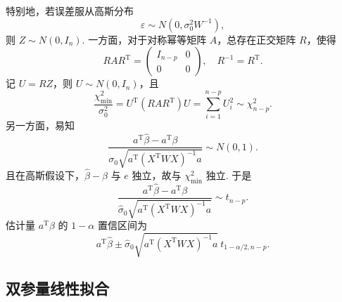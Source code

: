 特别地，若误差服从高斯分布
\begin{equation*}
	\varepsilon\sim N(0,\sigma_0^2W^{-1}),
\end{equation*}
则 \(Z\sim N(0,I_n)\). 一方面，对于对称幂等矩阵 \(A\)，总存在正交矩阵 \(R\)，使得
\begin{equation*}
	RAR^\mathrm{T}=\begin{pmatrix}I_{n-p}&0\\0&0\end{pmatrix},
	\quad R^{-1}=R^\mathrm{T}.
\end{equation*}
记 \(U=RZ\)，则 \(U\sim N(0,I_n)\)，且
\begin{equation*}
	\frac{\chi_{\min}^2}{\sigma_0^2}
	=U^\mathrm{T}(RAR^\mathrm{T})U
	=\sum_{i=1}^{n-p}U_i^2\sim\chi^2_{n-p}.
\end{equation*}
另一方面，易知
\begin{equation*}
	\frac{a^\mathrm{T}\hat{\beta}-a^\mathrm{T}\beta}
	{\sigma_0\sqrt{a^\mathrm{T}(X^\mathrm{T}WX)^{-1}a}}\sim N(0,1).
\end{equation*}
且在高斯假设下，\(\hat{\beta}-\beta\) 与 \(e\) 独立，故与 \(\chi_{\min}^2\) 独立. 于是
\begin{equation*}
	\frac{a^\mathrm{T}\hat{\beta}-a^\mathrm{T}\beta}
	{\hat{\sigma}_0\sqrt{a^\mathrm{T}(X^\mathrm{T}WX)^{-1}a}}\sim t_{n-p}.
\end{equation*}
估计量 \(a^\mathrm{T}\beta\) 的 \(1-\alpha\) 置信区间为
\begin{equation*}
	a^\mathrm{T}\hat{\beta}\pm
	\hat{\sigma}_0\sqrt{a^\mathrm{T}(X^\mathrm{T}WX)^{-1}a}\ t_{1-\alpha/2,n-p}.
\end{equation*}

\subsection{双参量线性拟合}

